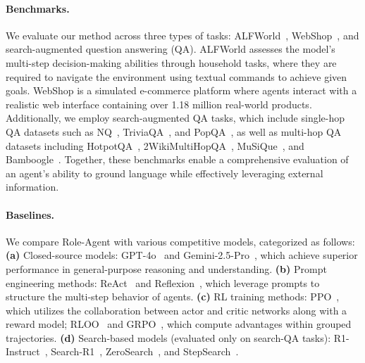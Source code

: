 \documentclass{llmxive}
\begin{document}
\paragraph{Benchmarks.} We evaluate our method across three types of tasks: ALFWorld~\cite{shridhar2020alfworld}, WebShop~\cite{yao2022webshop}, and search-augmented question answering (QA). ALFWorld assesses the model's multi-step decision-making abilities through household tasks, where they are required to navigate the environment using textual commands to achieve given goals. WebShop is a simulated e-commerce platform where agents interact with a realistic web interface containing over 1.18 million real-world products. Additionally, we employ search-augmented QA tasks, which include single-hop QA datasets such as NQ~\cite{kwiatkowski2019natural}, TriviaQA~\cite{joshi2017triviaqa}, and PopQA~\cite{mallen2023not}, as well as multi-hop QA datasets including HotpotQA~\cite{yang2018hotpotqa}, 2WikiMultiHopQA~\cite{ho2020constructing}, MuSiQue~\cite{trivedi2022musique}, and Bamboogle~\cite{press2023measuring}. Together, these benchmarks enable a comprehensive evaluation of an agent's ability to ground language while effectively leveraging external information.

\paragraph{Baselines.} We compare Role-Agent with various competitive models, categorized as follows: \textbf{(a)} Closed-source models: GPT-4o~\cite{achiam2023gpt} and Gemini-2.5-Pro~\cite{team2023gemini}, which achieve superior performance in general-purpose reasoning and understanding. \textbf{(b)} Prompt engineering methods: ReAct~\cite{yao2022react} and Reflexion~\cite{shinn2023reflexion}, which leverage prompts to structure the multi-step behavior of agents. \textbf{(c)} RL training methods: PPO~\cite{schulman2017proximal}, which utilizes the collaboration between actor and critic networks along with a reward model; RLOO~\cite{kool2019buy,ahmadian2024back} and GRPO~\cite{guo2025deepseek}, which compute advantages within grouped trajectories. \textbf{(d)} Search-based models (evaluated only on search-QA tasks): R1-Instruct~\cite{jin2025search}, Search-R1~\cite{jin2025search}, ZeroSearch~\cite{sun2025zerosearch}, and StepSearch~\cite{wang2025stepsearch}.
\end{document}

